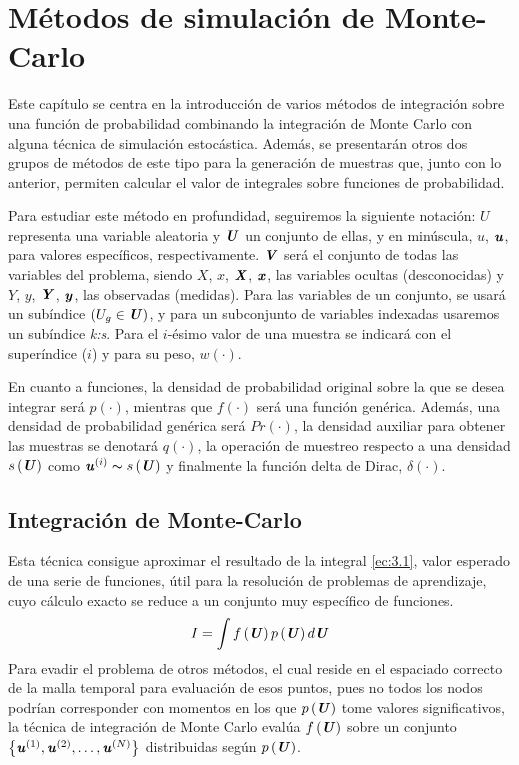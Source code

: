\chapter{Métodos de simulación de Monte-Carlo} \label{Capitulo 3}

Este capítulo se centra en la introducción de varios métodos de integración sobre una función de probabilidad combinando la integración de Monte Carlo con alguna técnica de simulación estocástica. Además, se presentarán otros dos grupos de métodos de este tipo para la generación de muestras que, junto con lo anterior,  permiten calcular el valor de integrales sobre funciones de probabilidad.

Para estudiar este método en profundidad, seguiremos la siguiente notación:
$U$ representa una variable aleatoria y $\textbf{\textit{U}}$ un conjunto de ellas, y en minúscula, $u$, $\textbf{\textit{u}}$, para valores específicos, respectivamente. $\textbf{\textit{V}}$ será el conjunto de todas las variables del problema, siendo $X$, $x$, $\textbf{\textit{X}}$, $\textbf{\textit{x}}$, las variables ocultas (desconocidas) y $\textit{Y}$, $y$, $\textbf{\textit{Y}}$, $\textbf{\textit{y}}$, las observadas (medidas). Para las variables de un conjunto, se usará un subíndice $\left(U_g \in \textbf{\textit{U}}\right)$, y para un subconjunto de variables indexadas usaremos un subíndice \textit{k:s}. Para el $i$-ésimo valor de una muestra se indicará con el superíndice ($i$) y para su peso, $w(\cdot)$.

En cuanto a funciones, la densidad de probabilidad original sobre la que se desea integrar será $p(\cdot)$, mientras que $f(\cdot)$ será una función genérica. Además, una densidad de probabilidad genérica será $Pr(\cdot)$, la densidad auxiliar para obtener las muestras se denotará $q(\cdot)$, la operación de muestreo respecto a una densidad $s\left(\textbf{\textit{U}}\right)$ como $\textbf{\textit{u}}^{(i)} \thicksim s\left(\textbf{\textit{U}}\right)$  y finalmente la función delta de Dirac, $\delta\left(\cdot\right)$.

\section{Integración de Monte-Carlo}
Esta técnica consigue aproximar el resultado de la integral \ref{ec:3.1}, valor esperado de una serie de funciones, útil para la resolución de problemas de aprendizaje, cuyo cálculo exacto se reduce a un conjunto muy específico de funciones.
\begin{equation}
    I = \int f\left(\textbf{\textit{U}}\right)p\left(\textbf{\textit{U}}\right)d\textbf{\textit{U}} 
    \label{ec:3.1}
\end{equation}
Para evadir el problema de otros métodos, el cual reside en el espaciado correcto de la malla temporal para evaluación de esos puntos, pues no todos los nodos podrían corresponder con momentos en los que $p\left(\textbf{\textit{U}}\right)$ tome valores significativos, la técnica de integración de  Monte Carlo evalúa $f\left(\textbf{\textit{U}}\right)$ sobre un conjunto $\left\{ \textbf{\textit{u}}^{(1)}, \textbf{\textit{u}}^{(2)}, \dots, \textbf{\textit{u}}^{(N)} \right\}$ distribuidas según $p\left(\textbf{\textit{U}}\right)$.

